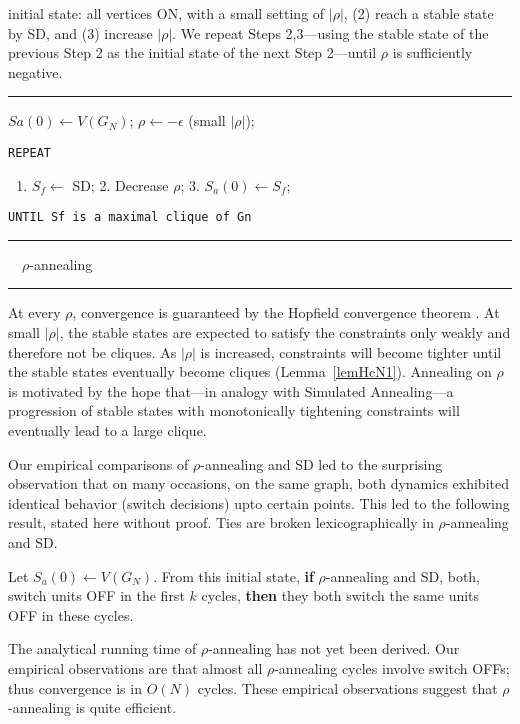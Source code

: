 initial state: all vertices ON, with a small setting of $|\rho|$, 
(2) reach a stable state by SD,
and (3) increase $|\rho|$. We repeat Steps 2,3---using the stable state
of the previous Step 2 as the initial state of the next Step 2---until 
$\rho$ is sufficiently negative. 
\newline
\rule{6.8in}{0.01in}
\newline
$Sa(0) \leftarrow V(G_N)$; $\rho \leftarrow -\epsilon$     (small $|\rho|$);\newline
\begin{verbatim}
REPEAT
\end{verbatim}
\begin{enumerate}
\item $S_f \leftarrow $ SD; 2. Decrease $\rho$; 3. $S_a(0) \leftarrow S_f$;
\end{enumerate}
\begin{verbatim}
UNTIL Sf is a maximal clique of Gn
\end{verbatim}
\rule{3.0in}{0.01in}
~~$\rho$-annealing~~
\rule{3.0in}{0.01in}
At every $\rho$, convergence is guaranteed by the Hopfield convergence 
theorem \cite{kn:Hop82}.
At small $|\rho|$, the stable states are expected to
satisfy the constraints only weakly and therefore not be cliques.
As $|\rho|$ is increased, constraints will become tighter until
the stable states eventually become cliques (Lemma~\ref{lemHcN1}).
Annealing on $\rho$ is motivated by the hope that---in analogy with 
Simulated Annealing---a progression of stable states with 
monotonically tightening constraints will eventually lead to a large clique. \par
Our empirical comparisons of $\rho$-annealing and SD led to
the surprising observation that on many occasions, on the same
graph, both dynamics 
exhibited identical behavior (switch decisions) upto certain points. 
This 
led to the following result, stated here without proof. 
Ties are broken lexicographically
in $\rho$-annealing and SD. 
\begin{lemma}
Let $S_a(0) \leftarrow V(G_N)$. From this initial state, {\bf if}
$\rho$-annealing and SD, both, switch units OFF in the first $k$ cycles,
{\bf then}
they both switch the same units OFF in these cycles.
\end{lemma}
The analytical running time of 
$\rho$-annealing has not yet been derived. Our empirical observations 
are that almost all $\rho$-annealing cycles
involve switch OFFs; thus convergence is in $O(N)$ cycles. These empirical observations
suggest that $\rho$-annealing is quite efficient.
